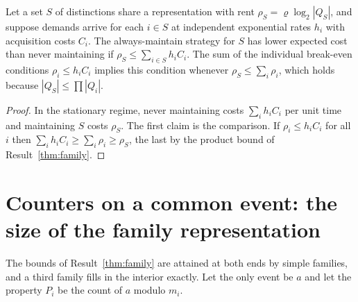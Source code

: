 \begin{newresult}\label{prop:shared}
Let a set $S$ of distinctions share a representation with rent $\rho_S=\varrho\log_2|Q_S|$, and suppose demands arrive for each $i\in S$ at independent exponential rates $h_i$ with acquisition costs $C_i$. The always-maintain strategy for $S$ has lower expected cost than never maintaining if $\rho_S\le\sum_{i\in S}h_iC_i$. The sum of the individual break-even conditions $\rho_i\le h_iC_i$ implies this condition whenever $\rho_S\le\sum_i\rho_i$, which holds because $|Q_S|\le\prod|Q_i|$.
\end{newresult}
\begin{proof}
In the stationary regime, never maintaining costs $\sum_ih_iC_i$ per unit time and maintaining $S$ costs $\rho_S$. The first claim is the comparison. If $\rho_i\le h_iC_i$ for all $i$ then $\sum_ih_iC_i\ge\sum_i\rho_i\ge\rho_S$, the last by the product bound of Result~\ref{thm:family}.
\end{proof}


\section[Counters on a common event]{Counters on a common event: the size of the family representation}\label{sec:lcm}

The bounds of Result~\ref{thm:family} are attained at both ends by simple families, and a third family fills in the interior exactly. Let the only event be $a$ and let the property $P_i$ be the count of $a$ modulo $m_i$.

